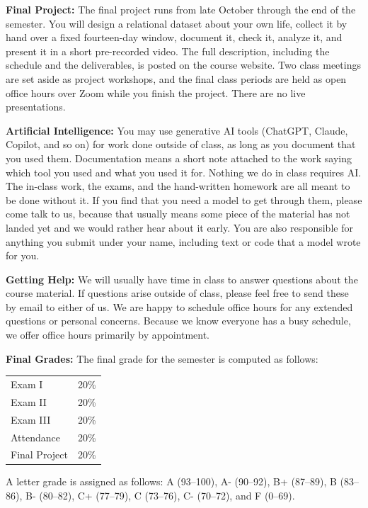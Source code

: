 \documentclass[11pt, a4paper]{article}
\begin{document}
\bigskip

\textbf{Final Project:}
The final project runs from late October through the end of the semester. You will
design a relational dataset about your own life, collect it by hand over a fixed
fourteen-day window, document it, check it, analyze it, and present it in a short pre-recorded video. The full description, including the schedule and the deliverables, is posted on the course website. Two class meetings are set aside as project workshops, and the final class periods are held as open office hours over Zoom while you finish the project. There are no live presentations.

\bigskip

\textbf{Artificial Intelligence:}
You may use generative AI tools (ChatGPT, Claude, Copilot, and so on) for work done outside of class, as long as you document that you used them. Documentation means a short note attached to the work saying which tool you used and what you used it for. Nothing we do in class requires AI. The in-class work, the exams, and the hand-written homework are all meant to be done without it. If you find that you need a model to get through them, please come talk to us, because that usually means some piece of the material has not landed yet and we would rather hear about it early. You are also responsible for anything you submit under your name, including text or code that a model wrote for you.

\bigskip

\textbf{Getting Help:}
We will usually have time in class to answer questions about the course
material. If questions arise outside of class, please feel free to send
these by email to either of us. We are happy to schedule office hours for any extended questions or personal concerns. Because we know everyone has a busy schedule, we offer office hours primarily by appointment.

\bigskip

\textbf{Final Grades:}
The final grade for the semester is computed as follows:

\medskip

\begin{tabular}{ll}
Exam I & 20\% \\
Exam II & 20\% \\
Exam III & 20\% \\
Attendance & 20\% \\
Final Project & 20\% \\
\end{tabular}

\medskip

A letter grade is assigned as follows:
             A (93--100), A- (90--92),
B+ (87--89), B (83--86),  B- (80--82),
C+ (77--79), C (73--76),  C- (70--72), and F (0--69).
\end{document}
